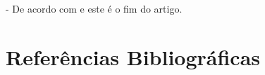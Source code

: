 \documentclass[a4paper,12pt]{article}  %
\begin{document}
   - De acordo com \cite{benante2008phd} e este é o fim do artigo.


\section{Referências Bibliográficas}

\nocite{*}


%



\end{document}
